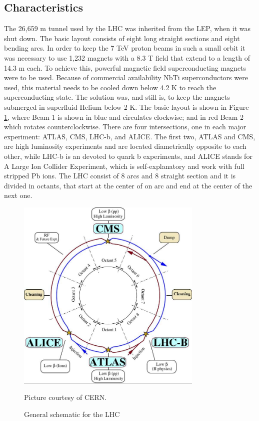 \subsection{Characteristics}
The 26,659 m tunnel used by the LHC was inherited from the LEP, when it was shut
down. The basic layout consists of eight long straight sections and eight
bending arcs\citep{keil}. In order to keep the 7 TeV proton beams in such a
small orbit it was necessary to use 1,232 magnets with a 8.3 T field that extend
to a length of 14.3 m each\citep{DR}. To achieve this, powerful magnetic field
superconducting magnets were to be used. Because of commercial availability NbTi
superconductors were used, this material needs to be cooled down below 4.2 K to
reach the superconducting state.  The solution was, and still is, to keep the
magnets submerged in superfluid Helium below 2 K\citep{keil}.  The basic layout
is shown in Figure \ref{Schem}, where Beam 1 is shown in blue and circulates
clockwise; and in red Beam 2 which rotates counterclockwise. There are four
intersections, one in each major experiment: ATLAS, CMS, LHC-b, and ALICE. The
first two, ATLAS and CMS, are high luminosity experiments and are located
diametrically opposite to each other, while LHC-b is an devoted to quark b
experiments, and ALICE stands for A Large Ion Collider Experiment, which is
self-explanatory and work with full stripped Pb ions. The LHC consist of 8 arcs
and 8 straight section and it is divided in octants, that start at the center of
on arc and end at the center of the next one\citep{DR}.
\begin{figure}
	\centering
  \begin{minipage}{\textwidth}
  	\centering
   	\includegraphics[width=3.5in]{Pictures/imagen.jpg}
  		\caption{\label{Schem}
   			General schematic for the LHC}
   			\footnotesize{Picture courtesy of CERN.}
   \end{minipage}
\end{figure}
